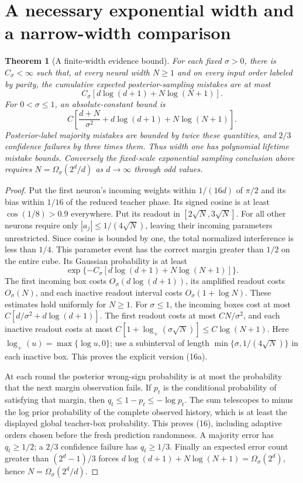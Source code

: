 \documentclass[11pt]{article}
\newtheorem{theorem}{Theorem}
\begin{document}
\section{A necessary exponential width and a narrow-width comparison}
\begin{theorem}[A finite-width evidence bound]
For each fixed $\sigma>0$, there is $C_\sigma<\infty$ such that,
at every neural width $N\ge1$ and on every input order labeled by
parity, the cumulative expected posterior-sampling mistakes are at most
\[
                  C_\sigma[d\log(d+1)+N\log(N+1)].      \tag{16}
\]
For $0<\sigma\le1$, an absolute-constant bound is
\[
 C\left[\frac{d+N}{\sigma^2}
             +d\log(d+1)+N\log(N+1)\right].                    \tag{16a}
\]
Posterior-label majority mistakes are bounded by twice these quantities,
and $2/3$ confidence failures by three times them.
Thus width one has polynomial lifetime mistake bounds.
Conversely the fixed-scale exponential sampling conclusion above
requires $N=\Omega_\sigma(2^d/d)$ as $d\to\infty$ through odd values.
\end{theorem}
\begin{proof}
Put the first neuron's incoming weights within $1/(16d)$ of $\pi/2$
and its bias within $1/16$ of the reduced teacher phase. Its signed
cosine is at least $\cos(1/8)>0.9$ everywhere.
Put its readout in $[2\sqrt N,3\sqrt N]$.
For all other neurons require only $|a_j|\le1/(4\sqrt N)$, leaving
their incoming parameters unrestricted. Since cosine is bounded by
one, the total normalized interference is less than $1/4$.
This parameter event has the correct margin greater than $1/2$ on
the entire cube. Its Gaussian probability is at least
\[
               \exp\{-C_\sigma[d\log(d+1)+N\log(N+1)]\}.
\]
The first incoming box costs $O_\sigma(d\log(d+1))$, its amplified
readout costs $O_\sigma(N)$, and each inactive readout interval costs
$O_\sigma(1+\log N)$. These estimates hold uniformly for $N\ge1$. For $\sigma\le1$, the incoming
boxes cost at most $C[d/\sigma^2+d\log(d+1)]$. The first readout costs
at most $CN/\sigma^2$, and each inactive readout costs at most
$C[1+\log_+(\sigma\sqrt N)]\le C\log(N+1)$.
Here $\log_+(u)=\max\{\log u,0\}$; use a subinterval of length
$\min\{\sigma,1/(4\sqrt N)\}$ in each inactive box.
This proves the explicit version (16a).

At each round the posterior wrong-sign probability is at most the
probability that the next margin observation fails. If $p_t$ is the
conditional probability of satisfying that margin, then
$q_t\le1-p_t\le-\log p_t$.
The sum telescopes to minus the log prior probability of the complete
observed history, which is at least the displayed global teacher-box
probability. This proves (16), including adaptive orders chosen before
the fresh prediction randomness. A majority error has $q_t\ge1/2$;
a $2/3$ confidence failure has $q_t\ge1/3$.
Finally an expected error count greater than $(2^d-1)/3$ forces
$d\log(d+1)+N\log(N+1)=\Omega_\sigma(2^d)$, hence
$N=\Omega_\sigma(2^d/d)$.
\end{proof}
\end{document}
